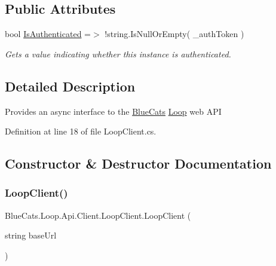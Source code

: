 \subsection*{Public Attributes}
\begin{DoxyCompactItemize}
\item 
bool \mbox{\hyperlink{class_blue_cats_1_1_loop_1_1_api_1_1_client_1_1_loop_client_a412425e79f996f5bc9c16a17b86e5926}{Is\+Authenticated}} =$>$ !string.\+Is\+Null\+Or\+Empty( \+\_\+auth\+Token )
\begin{DoxyCompactList}\small\item\em Gets a value indicating whether this instance is authenticated. \end{DoxyCompactList}\end{DoxyCompactItemize}


\subsection{Detailed Description}
Provides an async interface to the \mbox{\hyperlink{namespace_blue_cats}{Blue\+Cats}} \mbox{\hyperlink{namespace_blue_cats_1_1_loop}{Loop}} web A\+PI 



Definition at line 18 of file Loop\+Client.\+cs.



\subsection{Constructor \& Destructor Documentation}
\mbox{\label{class_blue_cats_1_1_loop_1_1_api_1_1_client_1_1_loop_client_aea0919a8b6c36eda28b5bfcd1f4d5a63}} 
\subsubsection{\texorpdfstring{Loop\+Client()}{LoopClient()}}
{\footnotesize\ttfamily Blue\+Cats.\+Loop.\+Api.\+Client.\+Loop\+Client.\+Loop\+Client (\begin{DoxyParamCaption}\item[{string}]{base\+Url }\end{DoxyParamCaption})\hspace{0.3cm}{\ttfamily [inline]}}



